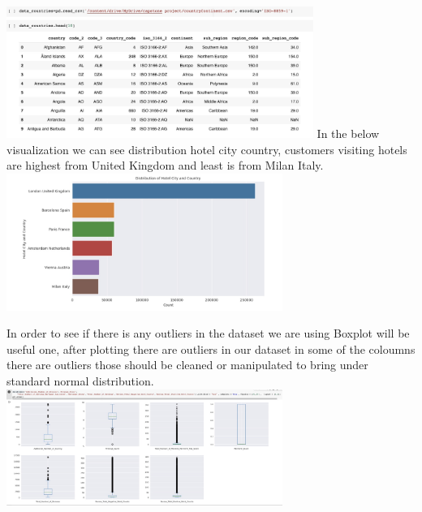 \includegraphics[width=10cm, height=10cm \textwidth]{country.jpeg}
In the below visualization we can see distribution hotel city country, customers visiting hotels are highest from United Kingdom and least is from Milan Italy.
\includegraphics[width=9cm, height=9cm \textwidth]{hotelcitycountry.jpeg}

 In order to see if there is any outliers in the dataset we are using Boxplot will be useful one, after plotting there are outliers in our dataset in some of the coloumns there are outliers those should be cleaned or manipulated to bring under standard normal distribution.\\
 
\includegraphics[width=9cm, height=6cm \textwidth]{Boxplot.jpeg}

